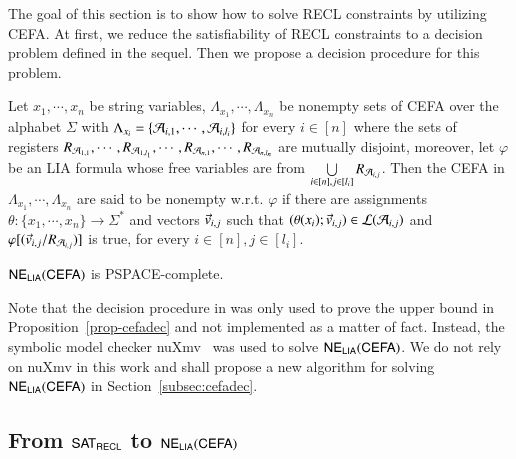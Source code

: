 
The goal of this section is to show how to solve RECL constraints by utilizing CEFA. 
At first, we reduce the satisfiability of RECL constraints to a decision problem defined in the sequel. Then we propose a decision procedure for this problem. 

\begin{definition}[$\cefadec$]\label{def-cefadec}
Let $x_1, \cdots, x_n$ be string variables, $\Lambda_{x_1}, \cdots, \Lambda_{x_n}$ be nonempty sets of CEFA over the alphabet $\Sigma$ with $\Lambda_{x_i} = \{\mathcal{A}_{i, 1}, \cdots, \mathcal{A}_{i, l_i}\}$ for every $i \in [n]$ where the sets of registers $R_{\mathcal{A}_{1, 1}}, \cdots, R_{\mathcal{A}_{1, l_1}}, \cdots, R_{\mathcal{A}_{n, 1}}, \cdots, R_{\mathcal{A}_{n, l_n}}$ are mutually disjoint, moreover, let $\varphi$ be an LIA formula whose free variables are from $ \bigcup \limits_{i \in [n], j \in [l_i]} R_{\mathcal{A}_{i, j}}$. Then  the CEFA in $\Lambda_{x_1}, \cdots, \Lambda_{x_n}$ are said to be nonempty w.r.t. $\varphi$ if there are assignments $\theta: \{x_1, \cdots, x_n\} \rightarrow \Sigma^*$ and vectors $\vec{v}_{i,j}$
such that $(\theta(x_i); \vec{v}_{i,j}) \in \mathcal{L}(\mathcal{A}_{i, j})$ and  $\varphi[(\vec{v}_{i,j}/R_{\mathcal{A}_{i,j}})]$ is true, for every $i \in [n], j \in [l_i]$.
\end{definition}

\begin{proposition}\label{prop-cefadec}
$\cefadec$ is PSPACE-complete. 
\end{proposition}
Note that the decision procedure in \cite{atva2020} was only used to prove the upper bound in Proposition~\ref{prop-cefadec} and not implemented as a matter of fact. Instead, the symbolic model checker nuXmv~\cite{nuxmv} was used to solve $\cefadec$. We do not rely on nuXmv in this work and shall propose a new algorithm for solving $\cefadec$ in Section~\ref{subsec:cefadec}. 

\subsection{From ${\sf SAT_{RECL}}$ to $\cefadec$} \label{subsec:regex2cefa}

